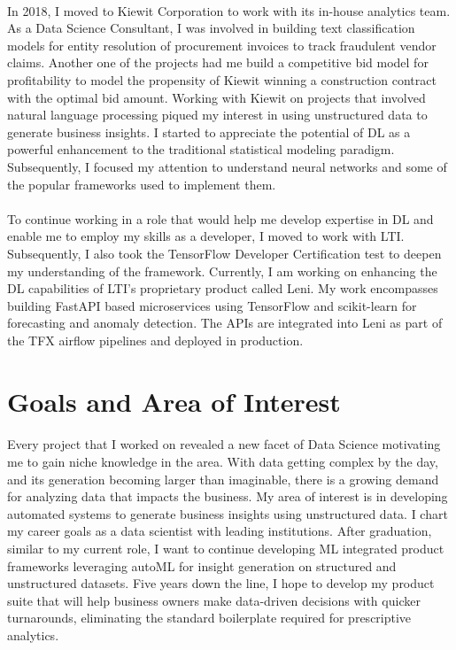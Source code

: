 \documentclass[letterpaper]{article}
\begin{document}
\paragraph{}
In 2018, I moved to Kiewit Corporation to work with its in-house analytics team. As a Data
Science Consultant, I was involved in building text classification models for entity resolution of
procurement invoices to track fraudulent vendor claims. Another one of the projects had me build a
competitive bid model for profitability to model the propensity of Kiewit winning a construction contract
with the optimal bid amount. Working with Kiewit on projects that involved natural language processing
piqued my interest in using unstructured data to generate business insights. I started to appreciate the
potential of DL as a powerful enhancement to the traditional statistical modeling paradigm.
Subsequently, I focused my attention to understand neural networks and some of the popular
frameworks used to implement them.

\paragraph{}
To continue working in a role that would help me develop expertise in DL and enable me to
employ my skills as a developer, I moved to work with LTI. Subsequently, I also took the TensorFlow
Developer Certification test to deepen my understanding of the framework. Currently, I am working on
enhancing the DL capabilities of LTI's proprietary product called Leni. My work encompasses building
FastAPI based microservices using TensorFlow and scikit-learn for forecasting and anomaly detection.
The APIs are integrated into Leni as part of the TFX airflow pipelines and deployed in production.

\section*{Goals and Area of Interest}
\paragraph{}
Every project that I worked on revealed a new facet of Data Science motivating me to gain niche
knowledge in the area. With data getting complex by the day, and its generation becoming larger than
imaginable, there is a growing demand for analyzing data that impacts the business. My area of interest
is in developing automated systems to generate business insights using unstructured data. I chart my
career goals as a data scientist with leading institutions. After graduation, similar to my current role,
I want to continue developing ML integrated product frameworks leveraging autoML for insight generation on structured and unstructured datasets. Five years down the line, I hope to develop my product suite that will help
business owners make data-driven decisions with quicker turnarounds, eliminating the standard boilerplate required for prescriptive analytics.
\end{document}
